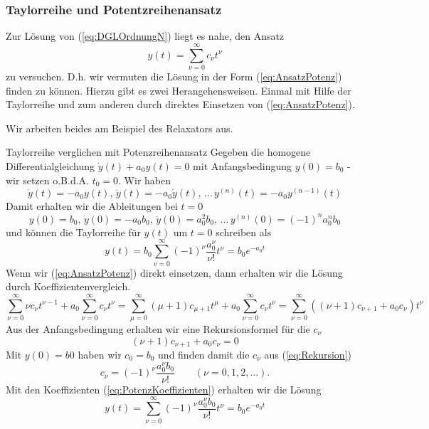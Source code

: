 \subsubsection{Taylorreihe und  Potentzreihenansatz}
Zur Lösung von (\ref{eq:DGLOrdnungN}) liegt es nahe, den Ansatz
\begin{equation}
  y(t)=\sum\limits_{\nu=0}^{\infty}c_\nu t^\nu
  \label{eq:AnsatzPotenz}
\end{equation}
zu versuchen. D.h. wir vermuten die Lösung in der Form (\ref{eq:AnsatzPotenz})
finden zu können. Hierzu gibt es zwei Herangehensweisen. Einmal mit Hilfe der
Taylorreihe und zum anderen durch direktes Einsetzen von
(\ref{eq:AnsatzPotenz}). 

Wir arbeiten beides am Beispiel des Relaxators aus.
\begin{example}{Taylorreihe verglichen mit Potenzreihenansatz}
  Gegeben die homogene Differentialgleichung $\dot{y}(t)+a_0y(t)=0$ mit
  Anfangsbedingung $y(0)=b_0$ - wir setzen o.B.d.A. $t_0=0$. Wir haben
  \[ \dot{y}(t)=-a_0y(t),\, \ddot{y}(t)=-a_0\dot{y}(t),\,\dots\, 
      y^{(n)}(t)=-a_0y^{(n-1)}(t)\]
  Damit erhalten wir die Ableitungen bei $t=0$
  \[ y(0)=b_0,\, \dot{y}(0)=-a_0b_0,\, \ddot{y}(0)=a_0^2b_0,\,\dots\, 
     y^{(n)}(0)=(-1)^na_0^nb_0\]
  und können die Taylorreihe für $y(t)$ um $t=0$ schreiben als
  \begin{equation}
    y(t)=b_0\sum\limits_{\nu=0}^{\infty}(-1)^\nu\frac{a_0^\nu}{\nu!}t^\nu=b_0e^{-a_0t}
    \label{eq:SoluTaylor}
  \end{equation}
Wenn wir (\ref{eq:AnsatzPotenz}) direkt einsetzen, dann erhalten wir die Lösung
durch Koeffizientenvergleich.
  \[ \sum\limits_{\nu=0}^{\infty}\nu c_\nu t^{\nu-1}+ 
      a_0\sum\limits_{\nu=0}^{\infty}c_\nu t^\nu=
      \sum\limits_{\mu=0}^{\infty}(\mu+1)c_{\mu+1}t^\mu+ 
      a_0\sum\limits_{\nu=0}^{\infty}c_\nu t^\nu=
      \sum\limits_{\nu=0}^{\infty} \left((\nu+1)c_{\nu+1}+a_0c_\nu\right) t^\nu
  \]
  Aus der Anfangsbedingung erhalten wir eine Rekursionsformel für die $c_\nu$
  \begin{equation}
    (\nu+1)c_{\nu+1}+a_0c_\nu=0
    \label{eq:Rekursion}
  \end{equation}
  Mit $y(0)=b0$ haben wir $c_0=b_0$ und finden damit die $c_\nu$ aus
  (\ref{eq:Rekursion}) 
    \begin{equation}
      c_{\nu}=(-1)^\nu\frac{a_0^\nu b_0}{\nu!}\qquad (\nu=0,1,2,\dots).
    \label{eq:PotenzKoeffizienten}
  \end{equation}
  Mit den Koeffizienten (\ref{eq:PotenzKoeffizienten}) erhalten wir die Lösung
  \begin{equation}
    y(t)=\sum\limits_{\nu=0}^{\infty}(-1)^\nu\frac{a_0^\nu b_0}{\nu!}t^\nu=b_0e^{-a_0t}
    \label{eq:SoluPotenz}
  \end{equation}
\end{example}
%
